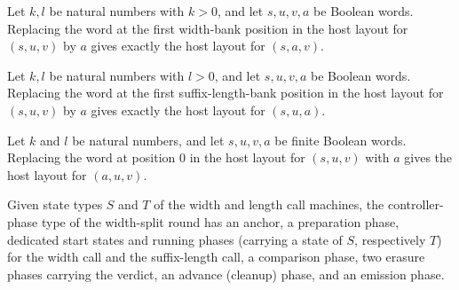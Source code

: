 \begin{lemma}
\label{Turing.FinTM.emitterP2_update_left}
\leanok
{}
Let $k,l$ be natural numbers with $k>0$, and let $s,u,v,a$ be Boolean words. Replacing
the word at the first width-bank position in the host layout for $(s,u,v)$ by $a$ gives
exactly the host layout for $(s,a,v)$.
\end{lemma}

\begin{lemma}
\label{Turing.FinTM.emitterP2_update_right}
\leanok
{}
Let $k,l$ be natural numbers with $l>0$, and let $s,u,v,a$ be Boolean words. Replacing
the word at the first suffix-length-bank position in the host layout for $(s,u,v)$ by
$a$ gives exactly the host layout for $(s,u,a)$.
\end{lemma}

\begin{lemma}
\label{Turing.FinTM.emitterP2_update_candidate}
\leanok
{}
Let $k$ and $l$ be natural numbers, and let $s,u,v,a$ be finite Boolean words. Replacing
the word at position $0$ in the host layout for $(s,u,v)$ with $a$ gives the host layout
for $(a,u,v)$.
\end{lemma}

\begin{definition}
\label{Turing.FinTM.EmitterP2State}
\leanok
Given state types $S$ and $T$ of the width and length call machines, the
controller-phase type of the width-split round has an anchor, a preparation
phase, dedicated start states and running phases (carrying a state of $S$,
respectively $T$) for the width call and the suffix-length call, a
comparison phase, two erasure phases carrying the verdict, an advance
(cleanup) phase, and an emission phase.
\end{definition}

